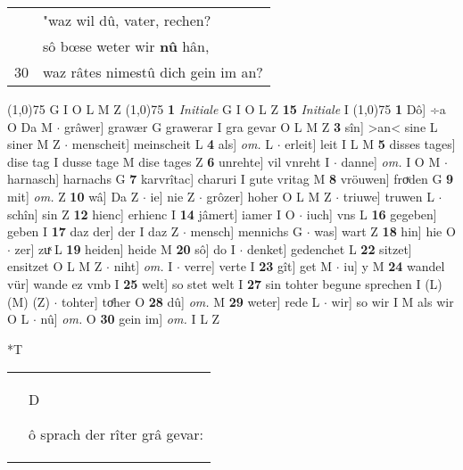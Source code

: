 \documentclass[8pt,a4paper,notitlepage]{article}
\begin{document}
\begin{table}[ht]
\begin{minipage}[t]{0.5\linewidth}
\begin{tabular}{rl}
 & "waz wil dû, vater, rechen?\\ 
 & sô bœse weter wir \textbf{nû} hân,\\ 
30 & waz râtes nimestû dich gein im an?\\ 
\end{tabular}
\scriptsize
\line(1,0){75} \newline
G I O L M Z \newline
\line(1,0){75} \newline
\textbf{1} \textit{Initiale} G I O L Z  \textbf{15} \textit{Initiale} I  \newline
\line(1,0){75} \newline
\textbf{1} Dô] ÷a O Da M  $\cdot$ grâwer] grawær G grawerar I gra gevar O L M Z \textbf{3} sîn] >an< sine L siner M Z  $\cdot$ menscheit] meinscheit L \textbf{4} als] \textit{om.} L  $\cdot$ erleit] leit I L M \textbf{5} disses tages] dise tag I dusse tage M dise tages Z \textbf{6} unrehte] vil vnreht I  $\cdot$ danne] \textit{om.} I O M  $\cdot$ harnasch] harnachs G \textbf{7} karvrîtac] charuri I gute vritag M \textbf{8} vröuwen] froͮden G \textbf{9} mit] \textit{om.} Z \textbf{10} wâ] Da Z  $\cdot$ ie] nie Z  $\cdot$ grôzer] hoher O L M Z  $\cdot$ triuwe] truwen L  $\cdot$ schîn] sin Z \textbf{12} hienc] erhienc I \textbf{14} jâmert] iamer I O  $\cdot$ iuch] vns L \textbf{16} gegeben] geben I \textbf{17} daz der] der I daz Z  $\cdot$ mensch] mennichs G  $\cdot$ was] wart Z \textbf{18} hin] hie O  $\cdot$ zer] zuͯ L \textbf{19} heiden] heide M \textbf{20} sô] do I  $\cdot$ denket] gedenchet L \textbf{22} sitzet] ensitzet O L M Z  $\cdot$ niht] \textit{om.} I  $\cdot$ verre] verte I \textbf{23} gît] get M  $\cdot$ iu] y M \textbf{24} wandel vür] wande ez vmb I \textbf{25} welt] so stet welt I \textbf{27} sin tohter begune sprechen I (L) (M) (Z)  $\cdot$ tohter] toͤher O \textbf{28} dû] \textit{om.} M \textbf{29} weter] rede L  $\cdot$ wir] so wir I M als wir O L  $\cdot$ nû] \textit{om.} O \textbf{30} gein im] \textit{om.} I L Z \newline
\end{minipage}
\hspace{0.5cm}
\begin{minipage}[t]{0.5\linewidth}
\small
\begin{center}*T
\end{center}
\begin{tabular}{rl}
 & \begin{large}D\end{large}ô sprach der rîter grâ gevar:\\ 

\end{tabular}
\end{minipage}
\end{table}
\end{document}

